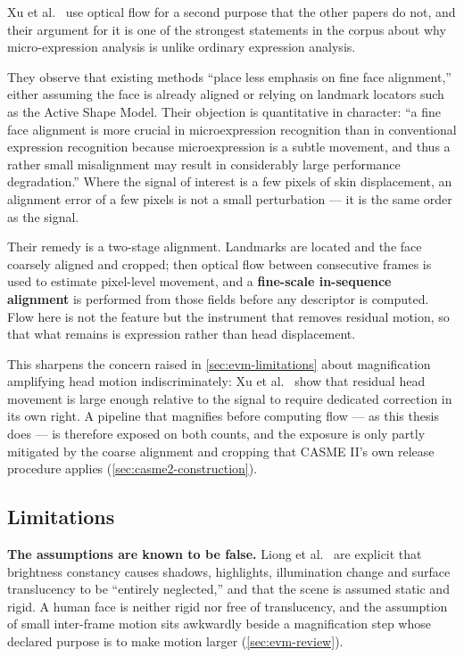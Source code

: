 Xu et al.~\cite{xu2017} use optical flow for a second purpose that the other papers do not, and their argument for it is one of the strongest statements in the corpus about why micro-expression analysis is unlike ordinary expression analysis.

They observe that existing methods ``place less emphasis on fine face alignment,'' either assuming the face is already aligned or relying on landmark locators such as the Active Shape Model. Their objection is quantitative in character: ``a fine face alignment is more crucial in microexpression recognition than in conventional expression recognition because microexpression is a subtle movement, and thus a rather small misalignment may result in considerably large performance degradation.'' Where the signal of interest is a few pixels of skin displacement, an alignment error of a few pixels is not a small perturbation --- it is the same order as the signal.

Their remedy is a two-stage alignment. Landmarks are located and the face coarsely aligned and cropped; then optical flow between consecutive frames is used to estimate pixel-level movement, and a \textbf{fine-scale in-sequence alignment} is performed from those fields before any descriptor is computed. Flow here is not the feature but the instrument that removes residual motion, so that what remains is expression rather than head displacement.

This sharpens the concern raised in \autoref{sec:evm-limitations} about magnification amplifying head motion indiscriminately: Xu et al.~\cite{xu2017} show that residual head movement is large enough relative to the signal to require dedicated correction in its own right. A pipeline that magnifies before computing flow --- as this thesis does --- is therefore exposed on both counts, and the exposure is only partly mitigated by the coarse alignment and cropping that CASME II's own release procedure applies (\autoref{sec:casme2-construction}).

\subsection{Limitations}
\label{sec:flow-limitations}

\textbf{The assumptions are known to be false.} Liong et al.~\cite{liong2019a} are explicit that brightness constancy causes shadows, highlights, illumination change and surface translucency to be ``entirely neglected,'' and that the scene is assumed static and rigid. A human face is neither rigid nor free of translucency, and the assumption of small inter-frame motion sits awkwardly beside a magnification step whose declared purpose is to make motion larger (\autoref{sec:evm-review}).

